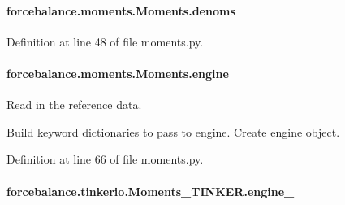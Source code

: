 \hypertarget{classforcebalance_1_1moments_1_1Moments_af8711c91b434e0c8a54a6e4c96e58f3b}{
\paragraph[{denoms}]{\setlength{\rightskip}{0pt plus 5cm}forcebalance.\-moments.\-Moments.\-denoms\hspace{0.3cm}{\ttfamily [inherited]}}}\label{classforcebalance_1_1moments_1_1Moments_af8711c91b434e0c8a54a6e4c96e58f3b}


Definition at line 48 of file moments.\-py.

\hypertarget{classforcebalance_1_1moments_1_1Moments_a5066d63381229cf44dd520b94e6b4d54}{
\paragraph[{engine}]{\setlength{\rightskip}{0pt plus 5cm}forcebalance.\-moments.\-Moments.\-engine\hspace{0.3cm}{\ttfamily [inherited]}}}\label{classforcebalance_1_1moments_1_1Moments_a5066d63381229cf44dd520b94e6b4d54}


Read in the reference data. 

Build keyword dictionaries to pass to engine. Create engine object. 

Definition at line 66 of file moments.\-py.

\hypertarget{classforcebalance_1_1tinkerio_1_1Moments__TINKER_a17ffd3b75c45ac3f701f5d3022c0a76b}{
\paragraph[{engine\-\_\-}]{\setlength{\rightskip}{0pt plus 5cm}forcebalance.\-tinkerio.\-Moments\-\_\-\-T\-I\-N\-K\-E\-R.\-engine\-\_\-}}\label{classforcebalance_1_1tinkerio_1_1Moments__TINKER_a17ffd3b75c45ac3f701f5d3022c0a76b}


